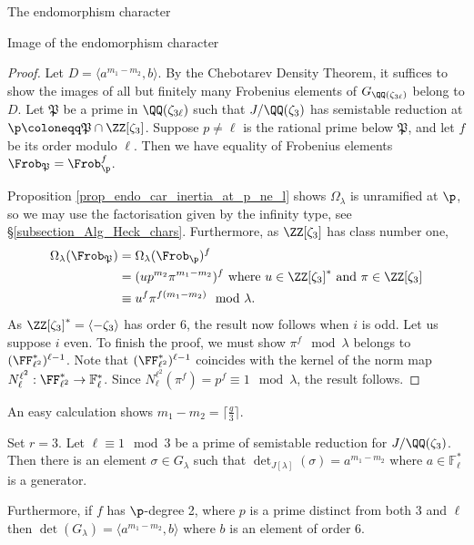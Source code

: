 \documentclass[11pt,a4paper]{article}
\newcommand{\Fl}{\mathbb{F}_\ell}
\newcommand{\B}{\mathfrak{P}}
\newcommand{\Gcyclo}[1]{G_{\QQ(\zeta_{#1})}}
\newcommand{\Glam}{G_{\lambda}}
\begin{document}
\begin{section}{The endomorphism character}
\begin{subsection}{Image of the endomorphism character}
\begin{proof}
Let $D = \langle a^{m_1-m_2},b\rangle$. By the Chebotarev Density Theorem, it suffices to show the images of all but finitely many Frobenius elements of $\Gcyclo{3 \ell}$ belong to  $D$.
Let $\B$ be a prime in $\QQ(\zeta_{3\ell})$ such that $J/\QQ(\zeta_3)$ has semistable reduction at $\p \coloneqq \B \cap \ZZ[\zeta_3]$.
Suppose $p \neq \ell$ is the rational prime below $\B$, and let $f$ be its order modulo $\ell$. Then we have equality of Frobenius elements $\Frob_\B = \Frob_\p^f$.

Proposition \ref{prop_endo_car_inertia_at_p_ne_l} shows $\Omega_\lambda$ is unramified at $\p$, so we may use the factorisation given by the infinity type, see \S \ref{subsection_Alg_Heck_chars}. Furthermore, as $\ZZ[\zeta_3]$ has class number one,
\begin{align*}
    \Omega_\lambda(\Frob_\B) & = \Omega_\lambda(\Frob_\p)^f \\
     &= (up^{m_2}\pi^{m_1-m_2})^f \text{ where $u\in \ZZ[\zeta_3]^*$ and $\pi \in \ZZ[\zeta_3]$}\\
    & \equiv u^f\pi^{f(m_1-m_2)} \mod{\lambda}.
\end{align*}
As $\ZZ[\zeta_3]^*=\langle -\zeta_3 \rangle$ has order 6, the result now follows when $i$ is odd.
Let us suppose $i$ even.
To finish the proof, we must show $\pi^f \mod{\lambda}$ belongs to $(\FF_{\ell^2}^*)^{\ell-1}$.
Note that $(\FF_{\ell^2}^*)^{\ell-1}$ coincides with the kernel of the norm map $N_\ell^{\ell^2}:\FF_{\ell^2}^* \rightarrow \Fl^*$.
Since $N_\ell^{\ell^2}(\pi^f)=p^f \equiv 1 \mod{\lambda}$, the result follows.
\end{proof}

\begin{remark}
\label{remark_ceiling_of_g_over_3}
An easy calculation shows $m_1-m_2=\lceil \frac{g}{3} \rceil$.
\end{remark}



\begin{proposition}
\label{Prop_l_1_mod_3_full_Glam}
Set $r =3$. Let $\ell \equiv 1 \mod{3}$ be a prime of semistable reduction for $J/\QQ(\zeta_3)$. Then there is an element $\sigma \in \Glam$ such that $\det_{J[\lambda]}(\sigma) = a^{m_1-m_2}$ where $a \in \Fl^*$ is a generator.

Furthermore, if $f$ has $\p$-degree 2, where $p$ is a prime distinct from both $3$ and $\ell$ then $\det(\Glam)= \langle a^{m_1-m_2},b\rangle $
 where $b$ is an element of order $6$.


\end{proposition}
\end{subsection}
\end{section}
\end{document}
